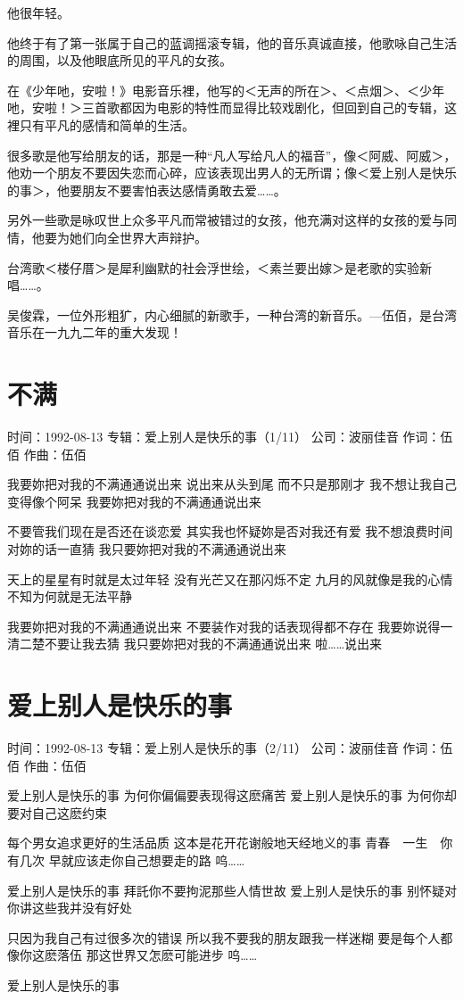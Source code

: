 \documentclass[UTF8,a4paper,oneside,twocolumn,12pt]{ctexbook}
\newcommand{\infopair}[2]{\textbullet #1：#2}
\newcommand{\zc}[1][伍佰]{\infopair{作词}{#1}}
\newcommand{\zq}[1][伍佰]{\infopair{作曲}{#1}}
\newcommand{\zj}[1]{\infopair{专辑}{#1}}
\newcommand{\sj}[1]{\infopair{时间}{#1}}
\newcommand{\gs}[1]{\infopair{公司}{#1}}
\newenvironment{info}{\begin{flushleft}\kaishu
	}
	{\end{flushleft}\normalsize\yahei\par}
\newenvironment{lyric}{
	}
{}
\begin{document}
他很年轻。

他终于有了第一张属于自己的蓝调摇滚专辑，他的音乐真诚直接，他歌咏自己生活的周围，以及他眼底所见的平凡的女孩。

在《少年吔，安啦！》电影音乐裡，他写的＜无声的所在＞、＜点烟＞、＜少年吔，安啦！＞三首歌都因为电影的特性而显得比较戏剧化，但回到自己的专辑，这裡只有平凡的感情和简单的生活。

很多歌是他写给朋友的话，那是一种“凡人写给凡人的福音”，像＜阿威、阿威＞，他劝一个朋友不要因失恋而心碎，应该表现出男人的无所谓；像＜爱上别人是快乐的事＞，他要朋友不要害怕表达感情勇敢去爱……。

另外一些歌是咏叹世上众多平凡而常被错过的女孩，他充满对这样的女孩的爱与同情，他要为她们向全世界大声辩护。

台湾歌＜楼仔厝＞是犀利幽默的社会浮世绘，＜素兰要出嫁＞是老歌的实验新唱……。

吴俊霖，一位外形粗犷，内心细腻的新歌手，一种台湾的新音乐。—伍佰，是台湾音乐在一九九二年的重大发现！

\section{不满}
\begin{info}
	\sj{1992-08-13}
	\zj{爱上别人是快乐的事（1/11）}
	\gs{波丽佳音}
	\zc
	\zq
\end{info}
\begin{lyric}
	我要妳把对我的不满通通说出来
	说出来从头到尾 而不只是那刚才
	我不想让我自己变得像个阿呆
	我要妳把对我的不满通通说出来

	不要管我们现在是否还在谈恋爱
	其实我也怀疑妳是否对我还有爱
	我不想浪费时间对妳的话一直猜
	我只要妳把对我的不满通通说出来

	天上的星星有时就是太过年轻
	没有光芒又在那闪烁不定
	九月的风就像是我的心情
	不知为何就是无法平静

	我要妳把对我的不满通通说出来
	不要装作对我的话表现得都不存在
	我要妳说得一清二楚不要让我去猜
	我只要妳把对我的不满通通说出来
	啦……说出来
\end{lyric}

\section{爱上别人是快乐的事}
\begin{info}
	\sj{1992-08-13}
	\zj{爱上别人是快乐的事（2/11）}
	\gs{波丽佳音}
	\zc
	\zq
\end{info}
\begin{lyric}
	爱上别人是快乐的事
	为何你偏偏要表现得这麽痛苦
	爱上别人是快乐的事
	为何你却要对自己这麽约束

	每个男女追求更好的生活品质
	这本是花开花谢般地天经地义的事
	青春　一生　你有几次
	早就应该走你自己想要走的路
	呜……

	爱上别人是快乐的事
	拜託你不要拘泥那些人情世故
	爱上别人是快乐的事
	别怀疑对你讲这些我并没有好处

	只因为我自己有过很多次的错误
	所以我不要我的朋友跟我一样迷糊
	要是每个人都像你这麽落伍
	那这世界又怎麽可能进步
	呜……

	爱上别人是快乐的事
\end{lyric}
\end{document}
